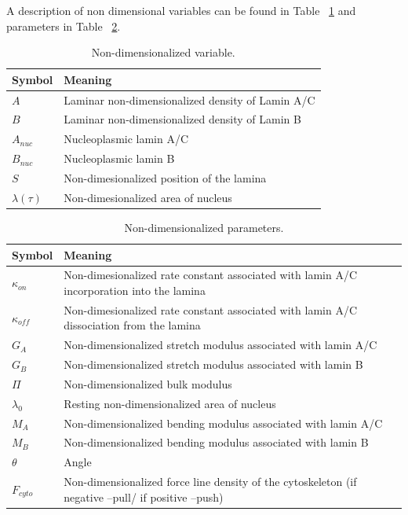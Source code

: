 A description of non dimensional variables can be found in Table ~\ref{tab:nondimvar} and parameters in Table ~\ref{tab:nondimpar}.

\begin{table}[t!]
\caption{Non-dimensionalized variable.}\centering \label{tab:nondimvar} 
\begin{tabular}{ l  l}
\hline
Symbol  & Meaning \\
\hline
$A$ & Laminar non-dimensionalized density of Lamin A/C \\
$B$ & Laminar non-dimensionalized density of Lamin B  \\
$A_{nuc}$ & Nucleoplasmic lamin A/C \\
$B_{nuc}$ & Nucleoplasmic lamin B\\
$S$ & Non-dimesionalized position of the lamina\\
$\lambda(\tau)$ & Non-dimesionalized area of nucleus\\
\hline
\end{tabular}
\end{table}


\begin{table}[t!]
\caption{Non-dimensionalized parameters.}\centering \label{tab:nondimpar} 
\begin{tabular}{ l  l}
\hline
Symbol  & Meaning \\
\hline
$\kappa_{on}$ &  Non-dimesionalized rate constant associated with lamin A/C incorporation into the lamina\\
$\kappa_{off}$ &  Non-dimesionalized rate constant associated with lamin A/C dissociation from the lamina\\
$G_A$ & Non-dimensionalized stretch modulus associated with lamin A/C \\
$G_B$ &  Non-dimensionalized stretch modulus associated with lamin B\\
$\Pi$ &  Non-dimensionalized bulk modulus \\
$\lambda_0$ & Resting non-dimensionalized area of nucleus\\
$M_A$ & Non-dimensionalized bending modulus associated with lamin A/C\\
$M_B$  & Non-dimensionalized bending modulus associated with lamin B\\
$\theta$ & Angle   \\
$F_{cyto}$ &  Non-dimensionalized force line density of the cytoskeleton (if negative --pull/ if positive --push) \\
\hline
\end{tabular}
\end{table}


